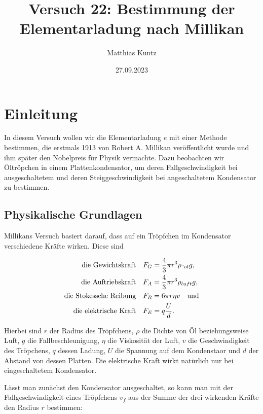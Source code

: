\documentclass{article}
\title{Versuch 22: Bestimmung der Elementarladung nach Millikan}
\author{Matthias Kuntz}
\date{27.09.2023}
\begin{document}
\maketitle

\section{Einleitung}

In diesem Versuch wollen wir die Elementarladung $e$ mit einer Methode bestimmen, die erstmals 1913 von Robert A. Millikan veröffentlicht wurde und ihm später den Nobelpreis für Physik vermachte. Dazu beobachten wir Öltröpchen in einem Plattenkondensator, um deren Fallgeschwindigkeit bei ausgeschaltetem und deren Steiggeschwindigkeit bei angeschaltetem Kondensator zu bestimmen.  

\subsection{Physikalische Grundlagen}

Millikans Versuch basiert darauf, dass auf ein Tröpfchen im Kondensator verschiedene Kräfte wirken. Diese sind

\begin{equation}
    \begin{split}
        \text{die Gewichtskraft}& \ \ \ F_G = \frac{4}{3}\pi r^3 \rho_{"ol}g, \\
        \text{die Auftriebskraft}& \ \ \ F_A = \frac{4}{3}\pi r^3 \rho_{luft}g, \\
        \text{die Stokessche Reibung}& \ \ \ F_R = 6\pi r\eta v \ \ \ \text{und} \\
        \text{die elektrische Kraft}& \ \ \ F_E = q\frac{U}{d}. \\
    \end{split}
    \label{eq:kräfte}
\end{equation}

Hierbei sind $r$ der Radius des Tröpfchens, $\rho$ die Dichte von Öl beziehungsweise Luft, $g$ die Fallbeschleunigung, $\eta$ die Viskosität der Luft, $v$ die Geschwindigkeit des Tröpchens, $q$ dessen Ladung, $U$ die Spannung auf dem Kondenstaor und $d$ der Abstand von dessen Platten. Die elektrische Kraft wirkt natürlich nur bei eingeschaltetem Kondensator. 

Lässt man zunächst den Kondensator ausgeschaltet, so kann man mit der Fallgeschwindigkeit eines Tröpfchens $v_f$ aus der Summe der drei wirkenden Kräfte den Radius $r$ bestimmen:
\end{document}
